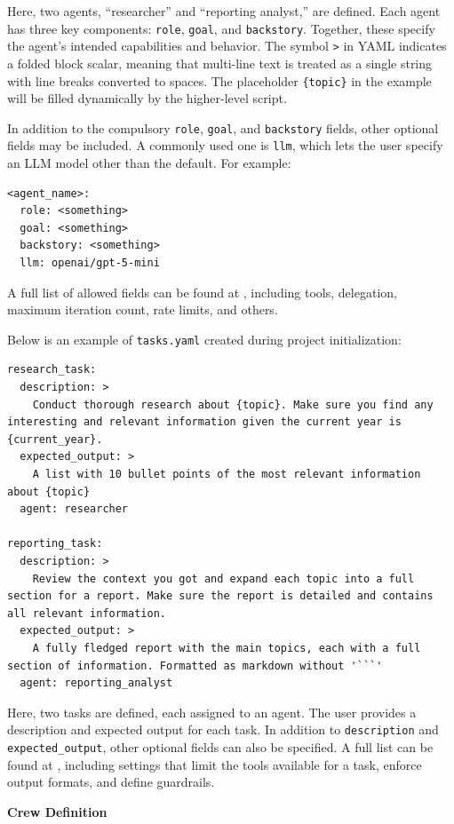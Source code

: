 Here, two agents, ``researcher'' and ``reporting analyst,'' are defined. Each agent has three key components: \verb|role|, \verb|goal|, and \verb|backstory|. Together, these specify the agent’s intended capabilities and behavior. The symbol \verb|>| in YAML indicates a folded block scalar, meaning that multi-line text is treated as a single string with line breaks converted to spaces. The placeholder \verb|{topic}| in the example will be filled dynamically by the higher-level script.

In addition to the compulsory \verb|role|, \verb|goal|, and \verb|backstory| fields, other optional fields may be included. A commonly used one is \verb|llm|, which lets the user specify an LLM model other than the default. For example:
\begin{lstlisting}
<agent_name>:
  role: <something>
  goal: <something>
  backstory: <something>
  llm: openai/gpt-5-mini
\end{lstlisting}
A full list of allowed fields can be found at \cite{crewaiAgentsConcepts}, including tools, delegation, maximum iteration count, rate limits, and others.

Below is an example of \verb|tasks.yaml| created during project initialization:
\begin{lstlisting}
research_task:
  description: >
    Conduct thorough research about {topic}. Make sure you find any interesting and relevant information given the current year is {current_year}.
  expected_output: >
    A list with 10 bullet points of the most relevant information about {topic}
  agent: researcher

reporting_task:
  description: >
    Review the context you got and expand each topic into a full section for a report. Make sure the report is detailed and contains all relevant information.
  expected_output: >
    A fully fledged report with the main topics, each with a full section of information. Formatted as markdown without '```'
  agent: reporting_analyst
\end{lstlisting}

Here, two tasks are defined, each assigned to an agent. The user provides a description and expected output for each task. In addition to \verb|description| and \verb|expected_output|, other optional fields can also be specified. A full list can be found at \cite{crewai2025tasks}, including settings that limit the tools available for a task, enforce output formats, and define guardrails.

\vspace{0.1in}
\noindent \textbf{Crew Definition}
\vspace{0.1in}

